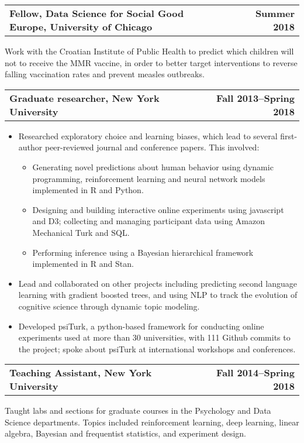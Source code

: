 \documentclass[10pt]{resume}
\begin{document}
\begin{addmargin}[1em]{0em}
\begin{tabular}{@{} L M R}
  \textbf{Fellow, Data Science for Social Good Europe, University of Chicago}& &\textbf{Summer 2018}\\
\end{tabular}\vspace{-1em}
  Work with the Croatian Institute of Public Health to predict which children will not to receive the MMR vaccine, in order to better
  target interventions to reverse falling vaccination rates and prevent measles outbreaks.

\begin{tabular}{@{} L M R}
  \textbf{Graduate researcher, New York University}& &\textbf{Fall 2013--Spring 2018}\\
\end{tabular}\vspace{-1em}
\begin{itemize}[noitemsep,topsep=-10pt,leftmargin=*]
\item Researched exploratory choice and learning biases, which lead to several first-author peer-reviewed journal and conference papers. This involved:
  \begin{itemize}[noitemsep,topsep=0pt]
  \item Generating novel predictions about human behavior using dynamic programming,
    reinforcement learning and neural network models implemented in R and Python.
  \item Designing and building interactive online experiments using javascript and D3;
    collecting and managing participant data using Amazon Mechanical Turk and SQL.
  \item Performing inference using a Bayesian hierarchical framework implemented in R and Stan.
  \end{itemize}
\item Lead and collaborated on other projects including predicting second language learning
  with gradient boosted trees, and using NLP to track the evolution of cognitive
  science through dynamic topic modeling.
\item Developed psiTurk, a python-based framework for
  conducting online experiments used at more than 30 universities, with 111 Github commits to the project; spoke
  about psiTurk at international workshops and conferences.\vspace{1em}
\end{itemize}
  

\begin{tabular}{@{} L M R}
  \textbf{Teaching Assistant, New York University}& &\textbf{Fall 2014--Spring 2018}\\
\end{tabular}\vspace{-1em}
  Taught labs and sections for graduate courses in the Psychology and
  Data Science departments. Topics included reinforcement learning, deep learning, linear algebra, Bayesian
  and frequentist statistics, and experiment design.


\end{addmargin}
\end{document}
